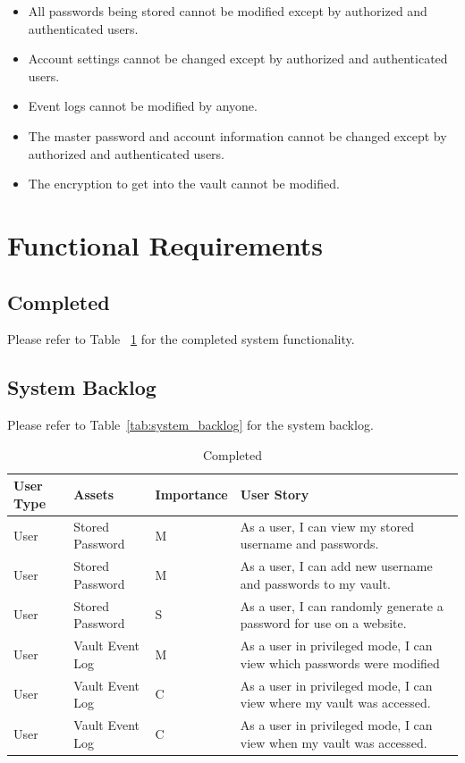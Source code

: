 \documentclass{article}
\begin{document}
\begin{description}
\begin{itemize}
      \item All passwords being stored cannot be modified except by authorized and authenticated users.
      \item Account settings cannot be changed except by authorized and authenticated users.
      \item Event logs cannot be modified by anyone.
      \item The master password and account information cannot be changed except by authorized and authenticated users.
      \item The encryption to get into the vault cannot be modified.
    \end{itemize}
\end{description}

\section{Functional Requirements}
\label{sec:functional_requirements}

\subsection{Completed}
\label{sub:completed}
Please refer to Table ~\ref{tab:completed} for the completed system functionality.

\subsection{System Backlog}
\label{sub:system_backlog}
Please refer to Table~\ref{tab:system_backlog} for the system backlog.

\begin{table}[H]
  \centering
  {
    \renewcommand\arraystretch{1.25}
    \begin{tabular}{>{\centering}m{1cm} >{\centering}m{4cm} >{\centering}m{2cm} >{\centering\arraybackslash}m{8cm} }
    \toprule
    User Type & Assets & Importance & User Story \\
    \midrule
    User & Stored Password & M & As a user, I can view my stored username and passwords. \\
    User & Stored Password & M & As a user, I can add new username and passwords to my vault. \\
    User & Stored Password & S & As a user, I can randomly generate a password for use on a website. \\
    User & Vault Event Log & M & As a user in privileged mode, I can view which passwords were modified \\
    User & Vault Event Log & C & As a user in privileged mode, I can view where my vault was accessed. \\
    User & Vault Event Log & C & As a user in privileged mode, I can view when my vault was accessed. \\
    \bottomrule
    \end{tabular}
  }
  \caption{Completed}
  \label{tab:completed}
\end{table}
\newpage
\end{document}
